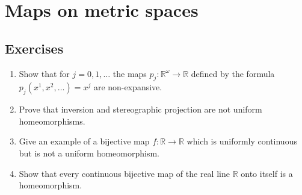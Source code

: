 \section{Maps on metric spaces}

\subsection*{Exercises}

\begin{enumerate}[label={(\alph*)}]
	\item Show that for \( j = 0, 1, \ldots \) the maps \( p_{j}: \mathbb{R}^{\omega} \to \mathbb{R} \) defined by the formula \( p_{j}(x^{1}, x^{2}, \ldots) = x^{j} \) are non-expansive.
	\item Prove that inversion and stereographic projection are not uniform homeomorphisms.
	\item Give an example of a bijective map \( f: \mathbb{R} \to \mathbb{R} \) which is uniformly continuous but is not a uniform homeomorphism.
	\item Show that every continuous bijective map of the real line \( \mathbb{R} \) onto itself is a homeomorphism.
\end{enumerate}

